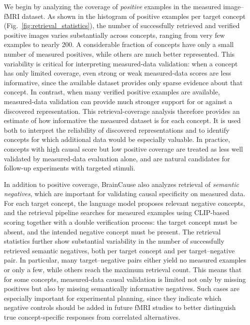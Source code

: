 \documentclass{article}
\begin{document}
We begin by analyzing the coverage of \emph{positive} examples in the measured image--fMRI dataset. As shown in the histogram of positive examples per target concept (Fig.~\ref{fig:retrieval_statistics}), the number of successfully retrieved and verified positive images varies substantially across concepts, ranging from very few examples to nearly 200. A considerable fraction of concepts have only a small number of measured positives, while others are much better represented. This variability is critical for interpreting measured-data validation: when a concept has only limited coverage, even strong or weak measured-data scores are less informative, since the available dataset provides only sparse evidence about that concept. In contrast, when many verified positive examples are available, measured-data validation can provide much stronger support for or against a discovered representation.
This retrieval-coverage analysis therefore provides an estimate of how informative the measured dataset is for each concept. It is used both to interpret the reliability of discovered representations and to identify concepts for which additional data would be especially valuable. In practice, concepts with high causal score but low positive coverage are treated as less well validated by measured-data evaluation alone, and are natural candidates for follow-up experiments with targeted stimuli.

In addition to positive coverage, BrainCause also analyzes retrieval of \emph{semantic negatives}, which are important for validating causal specificity on measured data. For each target concept, the language model proposes relevant negative concepts, and the retrieval pipeline searches for measured examples using CLIP-based scoring together with a double verification process: the target concept must be absent, and the intended negative concept must be present. The retrieval statistics further show substantial variability in the number of successfully retrieved semantic negatives, both per target concept and per target--negative pair. In particular, many target--negative pairs either yield no measured examples or only a few, while others reach the maximum retrieval count. This means that for some concepts, measured-data causal validation is limited not only by missing positives but also by missing semantically informative negatives. Such cases are especially important for experimental planning, since they indicate which negative controls should be added in future fMRI studies to better distinguish true concept-specific responses from correlated alternatives.
\end{document}
